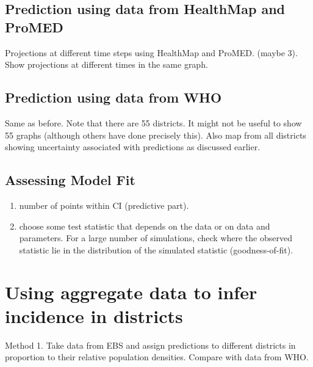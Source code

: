 \documentclass[a4paper,12pt]{article}
\begin{document}
 \subsection{Prediction using data from HealthMap and ProMED}
 Projections at different time steps using HealthMap and
 ProMED. (maybe 3).
 Show projections at different times in the same graph.

 \subsection{Prediction using data from WHO}
 Same as before. Note that there are 55 districts. It might not be
 useful to show 55 graphs (although others have done precisely this). 
 Also map from all districts showing uncertainty
 associated with predictions as discussed earlier.

 \subsection{Assessing Model Fit}
 \begin{enumerate}
 \item number of points within CI (predictive part).
 \item choose some test statistic that depends on the data or on data
   and parameters. For a large number of simulations, check where the
   observed statistic lie in the distribution of the simulated statistic (goodness-of-fit).
 \end{enumerate}
 
 \section{Using aggregate data to infer incidence in districts}

 Method 1. Take data from EBS and assign predictions to different
 districts in proportion to their relative population densities.
 Compare with data from WHO.
\end{document}
